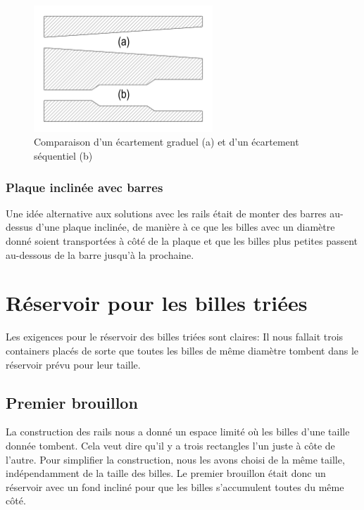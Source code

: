 \begin{figure}
    \centering
    \includegraphics[width=0.6\textwidth]{Graphics/Rails/ECARTEMENTS.pdf}
    \caption{Comparaison d'un écartement graduel (a) et d'un écartement séquentiel (b)}
\end{figure}

\subsubsection{Plaque inclinée avec barres}
Une idée alternative aux solutions avec les rails était de monter des barres au-dessus d'une plaque inclinée, de manière à ce que les billes avec un diamètre donné soient transportées à côté de la plaque et que les billes plus petites passent au-dessous de la barre jusqu'à la prochaine.


\section{Réservoir pour les billes triées}
Les exigences pour le réservoir des billes triées sont claires: Il nous fallait trois containers placés de sorte que toutes les billes de même diamètre tombent dans le réservoir prévu pour leur taille.

\subsection{Premier brouillon}
La construction des rails nous a donné un espace limité où les billes d'une taille donnée tombent. Cela veut dire qu'il y a trois rectangles l'un juste à côte de l'autre. Pour simplifier la construction, nous les avons choisi de la même taille, indépendamment de la taille des billes. Le premier brouillon était donc un réservoir avec un fond incliné pour que les billes s'accumulent toutes du même côté.

